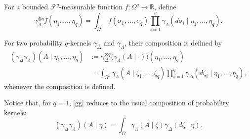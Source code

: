 \documentclass[11pt,reqno]{amsart}
\numberwithin{equation}{section} \setcounter{tocdepth}{1}
\begin{document}
For a bounded $\mathcal F^q$-measurable function
$f:\Omega^q\to\mathbb R$, define
\begin{equation}\label{fl}
	\gamma_\Lambda^{\otimes q}f
	(\eta_1,\ldots,\eta_q)
	=
	\int_{\Omega^q}
	f(\sigma_1,\ldots,\sigma_q)
	\prod_{i=1}^q
	\gamma_\Lambda(d\sigma_i\mid\eta_1,\ldots,\eta_q).
\end{equation}

For two probability $q$-kernels $\gamma_\Delta$ and $\gamma_\Lambda$,
their composition is defined by
\begin{equation}\label{gg}
	\begin{split}
		(\gamma_\Delta\gamma_\Lambda)
		(A\mid\eta_1,\ldots,\eta_q)
		&:=
		\gamma_\Delta^{\otimes q}
		\bigl(
		\gamma_\Lambda(A\mid\cdot)
		\bigr)
		(\eta_1,\ldots,\eta_q)
		\\
		&=
		\int_{\Omega^q}
		\gamma_\Lambda(A\mid\zeta_1,\ldots,\zeta_q)
		\prod_{i=1}^q
		\gamma_\Delta(d\zeta_i\mid\eta_1,\ldots,\eta_q),
	\end{split}
\end{equation}
whenever the composition is defined.

Notice that, for $q=1$, \eqref{gg} reduces to the usual composition of
probability kernels:
\[
(\gamma_\Delta\gamma_\Lambda)(A\mid\eta)
=
\int_\Omega
\gamma_\Lambda(A\mid\zeta)
\gamma_\Delta(d\zeta\mid\eta).
\]
\end{document}
